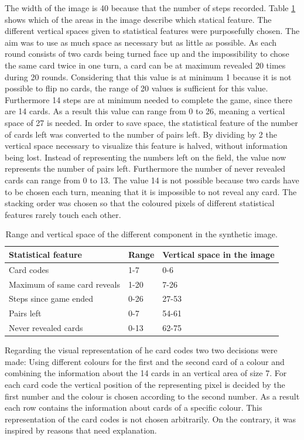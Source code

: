 The width of the image is 40 because that the number of steps recorded. Table \ref{tab:card_areas} shows which of the areas in the image describe which statical feature. The different vertical spaces given to statistical features were purposefully chosen. The aim was to use as much space as necessary but as little as possible. As each round consists of two cards being turned face up and the impossibility to chose the same card twice in one turn, a card can be at maximum revealed 20 times during 20 rounds. Considering that this value is at minimum 1 because it is not possible to flip no cards, the range of 20 values is sufficient for this value. Furthermore 14 steps are at minimum needed to complete the game, since there are 14 cards. As a result this value can range from 0 to 26, meaning a vertical space of 27 is needed. In order to save space, the statistical feature of the number of cards left was converted to the number of pairs left. By dividing by 2 the vertical space necessary to visualize this feature is halved, without information being lost. Instead of representing the numbers left on the field, the value now represents the number of pairs left. Furthermore the number of never revealed cards can range from 0 to 13. The value 14 is not possible because two cards have to be chosen each turn, meaning that it is impossible to not reveal any card. The stacking order was chosen so that the coloured pixels of different statistical features rarely touch each other. 
\begin{table}[H]
	\centering
	
	\begin{tabular}{|l|l|l|}
		\hline
		Statistical feature & Range & Vertical space in the image \\
		\hline
		Card codes & 1-7 & 0-6 \\
		Maximum of same card reveals & 1-20 & 7-26 \\
		Steps since game ended & 0-26 & 27-53 \\
		Pairs left & 0-7 & 54-61\\
		Never revealed cards & 0-13 & 62-75 \\
		\hline
	\end{tabular}
	\caption[Tabbelle kurz]{Range and vertical space of the different component in the synthetic image.}
	\label{tab:card_areas}
\end{table}

Regarding the visual representation of he card codes two two decisions were made: Using different colours for the first and the second card of a colour and combining the information about the 14 cards in an vertical area of size 7. For each card code the vertical position of the representing pixel is decided by the first number and the colour is chosen according to the second number. As a result each row contains the information about cards of a specific colour. This representation of the card codes is not chosen arbitrarily. On the contrary, it was inspired by reasons that need explanation.

